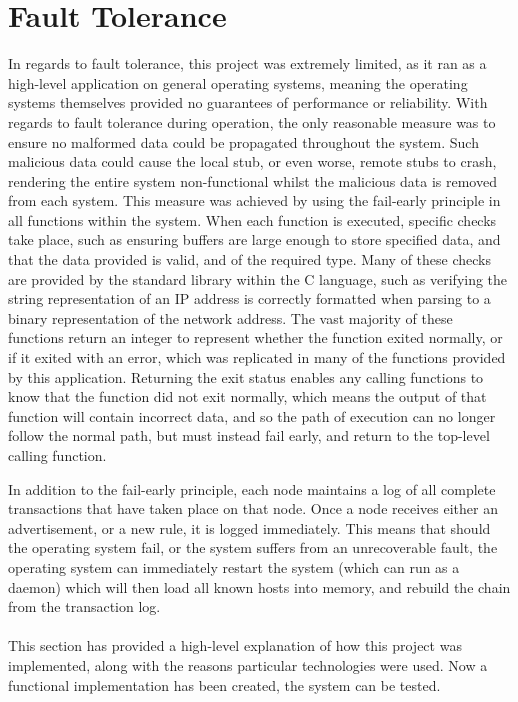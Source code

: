 \documentclass[a4paper, 11pt]{report}
\begin{document}
\section{Fault Tolerance}
In regards to fault tolerance, this project was extremely limited, as it ran as a high-level application on general operating systems, meaning the operating systems themselves provided no guarantees of  performance or reliability. With regards to fault tolerance during operation, the only reasonable measure was to ensure no malformed data could be propagated throughout the system. Such malicious data could cause the local \gls{stub}, or even worse, remote \gls{stub}s to crash, rendering the entire system non-functional whilst the malicious data is removed from each system. This measure was achieved by using the fail-early principle in all functions within the system. When each function is executed, specific checks take place, such as ensuring buffers are large enough to store specified data, and that the data provided is valid, and of the required type. Many of these checks are provided by the standard library within the C language, such as verifying the string representation of an \acrshort{IP} address is  correctly formatted when parsing to a binary representation of the network address. The vast majority of these functions return an integer to represent whether the function exited normally, or if it exited with an error, which was replicated in many of the functions provided by this application. Returning the exit status enables any calling functions to know that the function did not exit normally, which means the output of that function will contain incorrect data, and so the path of execution can no longer follow the normal path, but must instead fail early, and return to the top-level calling function.

In addition to the fail-early principle, each node maintains a log of all complete transactions that have taken place on that node. Once a node receives either an advertisement, or a new rule, it is logged immediately. This means that should the operating system fail, or the system suffers from an unrecoverable fault, the operating system can immediately restart the system (which can run as a daemon) which will then load all known hosts into memory, and rebuild the chain from the transaction log.\\\\

This section has provided a high-level explanation of how this project was implemented, along with the reasons particular technologies were used. Now a functional implementation has been created, the system can be tested.
\end{document}
